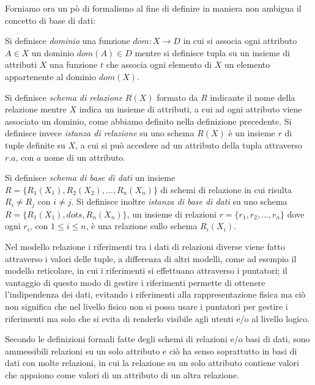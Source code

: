 \documentclass[a4paper,12pt, oneside]{book}
\begin{document}
Forniamo ora un pò di formalismo al fine di definire in maniera non ambigua il concetto di base di dati:
\begin{definizione}
    Si definisce \emph{dominio} una funzione $dom:X \to D$ in cui si associa ogni attributo $A \in X$ un 
    dominio $dom(A) \in D$ mentre si definisce tupla su un insieme di attributi $X$ una funzione $t$ che
    associa ogni elemento di $X$ un elemento appartenente al dominio $dom(X)$.
\end{definizione}
\begin{definizione}
    Si definisce \emph{schema di relazione} $R(X)$ formato da $R$ indicante il nome della relazione mentre $X$
    indica un insieme di attributi, a cui ad ogni attributo viene associato un dominio, come abbiamo definito
    nella definizione precedente.\newline
    Si definisce invece \emph{istanza di relazione} su uno schema $R(X)$ è un insieme $r$ di tuple definite su
    $X$, a cui si può accedere ad un attributo della tupla attraverso $r.a$, con $a$ nome di un attributo.
\end{definizione}
\begin{definizione}
    Si definisce \emph{schema di base di dati} un insieme $R = \{R_1(X_1), R_2(X_2), \dots, R_n(X_n)\}$ di
    schemi di relazione in cui risulta $R_i \neq R_j$ con $i \neq j$.\newline
    Si definisce inoltre \emph{istanza di base di dati} su uno schema $R = \{R_1(X_1), dots, R_n(X_n)\}$, un
    insieme di relazioni $r = \{r_1, r_2, \dots, r_n\}$ dove ogni $r_i$, con $1 \leq i \leq n$, è una
    relazione sullo schema $R_i(X_i)$.
\end{definizione}
Nel modello relazione i riferimenti tra i dati di relazioni diverse viene fatto attraverso i valori delle
tuple, a differenza di altri modelli, come ad esempio il modello reticolare, in cui i riferimenti si
effettuano attraverso i puntatori; il vantaggio di questo modo di gestire i riferimenti permette di ottenere
l'indipendenza dei dati, evitando i riferimenti alla rappresentazione fisica ma ciò non significa che nel
livello fisico non si possa usare i puntatori per gestire i riferimenti ma solo che si evita di renderlo
visibile agli utenti e/o al livello logico.

Secondo le definizioni formali fatte degli schemi di relazioni e/o basi di dati, sono ammessibili relazioni su
un solo attributo e ciò ha senso soprattutto in basi di dati con molte relazioni, in cui la relazione su un
solo attributo contiene valori che appaiono come valori di un attributo di un altra relazione.
\end{document}
